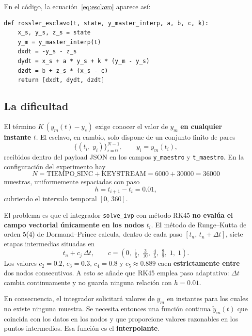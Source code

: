 \documentclass[12pt,a4paper]{article}
\begin{document}
En el código, la ecuación~\eqref{eq:esclavo} aparece así:

\begin{lstlisting}[caption={Campo vectorial del sistema esclavo}]
def rossler_esclavo(t, state, y_master_interp, a, b, c, k):
    x_s, y_s, z_s = state
    y_m = y_master_interp(t)
    dxdt = -y_s - z_s
    dydt = x_s + a * y_s + k * (y_m - y_s)
    dzdt = b + z_s * (x_s - c)
    return [dxdt, dydt, dzdt]
\end{lstlisting}

\subsection{La dificultad}

El término $K\,(y_m(t) - y_s)$ exige conocer el valor de $y_m$ \textbf{en cualquier instante $t$}. El esclavo, en cambio, solo dispone de un conjunto finito de pares
\begin{equation}
\{(t_i,\; y_i)\}_{i=0}^{N-1}, \qquad y_i = y_m(t_i),
\end{equation}
recibidos dentro del payload JSON en los campos \texttt{y\_maestro} y \texttt{t\_maestro}. En la configuración del experimento hay
\begin{equation}
N = \text{TIEMPO\_SINC} + \text{KEYSTREAM} = 6000 + 30000 = 36000
\end{equation}
muestras, uniformemente espaciadas con paso
\begin{equation}
h = t_{i+1} - t_i = 0.01,
\end{equation}
cubriendo el intervalo temporal $[0,\,360]$.

El problema es que el integrador \texttt{solve\_ivp} con método RK45 \textbf{no evalúa el campo vectorial únicamente en los nodos $t_i$}. El método de Runge--Kutta de orden 5(4) de Dormand--Prince calcula, dentro de cada paso $[t_n,\, t_n + \Delta t]$, siete etapas intermedias situadas en
\begin{equation}
t_n + c_j\,\Delta t, \qquad c = \left(0,\; \tfrac{1}{5},\; \tfrac{3}{10},\; \tfrac{4}{5},\; \tfrac{8}{9},\; 1,\; 1\right).
\end{equation}
Los valores $c_2 = 0.2$, $c_3 = 0.3$, $c_4 = 0.8$ y $c_5 \approx 0.889$ caen \textbf{estrictamente entre} dos nodos consecutivos. A esto se añade que RK45 emplea paso adaptativo: $\Delta t$ cambia continuamente y no guarda ninguna relación con $h = 0.01$.

En consecuencia, el integrador solicitará valores de $y_m$ en instantes para los cuales no existe ninguna muestra. Se necesita entonces una función continua $\tilde{y}_m(t)$ que coincida con los datos en los nodos y que proporcione valores razonables en los puntos intermedios. Esa función es el \textbf{interpolante}.
\end{document}
